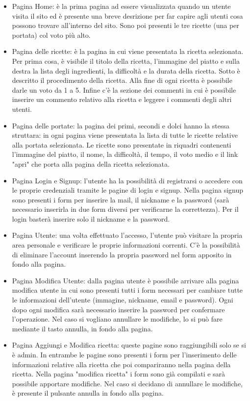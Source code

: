 \begin{itemize}
	\item Pagina Home: è la prima pagina ad essere visualizzata quando un utente visita il sito ed è presente una breve desrizione per far capire agli utenti cosa possono trovare all'interno del sito.
	Sono poi presenti le tre ricette (una per portata) col voto più alto.

	\item Pagina delle ricette: è la pagina in cui viene presentata la ricetta selezionata. Per prima cosa, è visibile il titolo della ricetta, l'immagine del piatto e sulla destra la lista degli ingredienti, la difficoltà e la durata della ricetta. Sotto è descritto il procedimento della ricetta. Alla fine di ogni ricetta è possibile darle un voto da 1 a 5. Infine c'è la sezione dei commenti in cui è possibile inserire un commento relativo alla ricetta e leggere i commenti degli altri utenti.
	\item Pagina delle portate: la pagina dei primi, secondi e dolci hanno la stessa struttara: in ogni pagina viene presentata la lista di tutte le ricette relative alla portata selezionata. Le ricette sono presentate in riquadri contenenti l'immagine del piatto, il nome, la difficoltà, il tempo, il voto medio e il link "apri" che porta alla pagina della ricetta selezionata.
	\item Pagina Login e Signup: l'utente ha la possibilità di registrarsi o accedere con le proprie credenziali tramite le pagine di login e signup. Nella pagina signup sono presenti i form per inserire la mail, il nickname e la password (sarà necessario inserirla in due form diversi per verificarne la correttezza). Per il login basterà inserire solo il nickname e la password.
	\item Pagina Utente: una volta effettuato l'accesso, l'utente può visitare la propria area personale e verificare le proprie informazioni correnti. C'è la possibilità di eliminare l'account inserendo la propria password nel form apposito in fondo alla pagina.
	\item Pagina Modifica Utente: dalla pagina utente è possibile arrivare alla pagina modifica utente in cui sono presenti tutti i form necessari per cambiare tutte le informazioni dell'utente (immagine, nickname, email e password). Ogni dopo ogni modifica sarà necessario inserire la password per confermare l'operazione. Nel caso si vogliano annullare le modifiche, lo si può fare mediante il tasto annulla, in fondo alla pagina.
	\item Pagina Aggiungi e Modifica ricetta: queste pagine sono raggiungibili solo se si è admin. In entrambe le pagine sono presenti i form per l'inserimento delle informazioni relative alla ricetta che poi compariranno nella pagina della ricetta. Nella pagina "modifica ricetta" i form sono già compilati e sarà possibile apportare modifiche. Nel caso si decidano di annullare le modifiche, è presente il pulsante annulla in fondo alla pagina.
\end{itemize}
